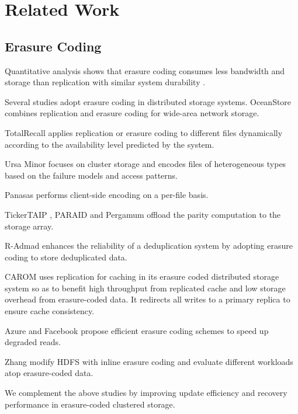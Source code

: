 \chapter{Related Work}
\label{chap:relatedwork}

\section{Erasure Coding}

Quantitative analysis shows that erasure coding consumes less bandwidth and
storage than replication with similar system durability
\cite{weatherspoon02,rodrigues05}.  

Several studies adopt erasure coding in
distributed storage systems.  OceanStore \cite{kubiatowicz00,rhea03} combines
replication and erasure coding for wide-area network storage.  

TotalRecall
\cite{bhagwan04} applies replication or erasure coding to different files
dynamically according to the availability level predicted by the system.  

Ursa Minor \cite{abd05} focuses on cluster storage and encodes files of
heterogeneous types based on the failure models and access patterns.  

Panasas \cite{welch08} performs client-side encoding on a per-file basis. 

TickerTAIP \cite{cao94}, PARAID \cite{weddle07} and Pergamum \cite{storer08}
offload the parity computation to the storage array.

R-Admad \cite{liu09} enhances the reliability of a deduplication
system by adopting erasure coding to store deduplicated data.  

CAROM \cite{ma13} uses replication for caching in its erasure coded distributed
storage system so as to benefit high throughput from replicated cache and low
storage overhead from erasure-coded data. It redirects all writes to a primary
replica to ensure cache consistency. 

Azure \cite{huang12} and Facebook \cite{sathiamoorthy13} propose efficient
erasure coding schemes to speed up degraded reads. 

Zhang \etal \cite{zhang10} modify HDFS with inline erasure coding and
evaluate different workloads atop erasure-coded data.

We complement the above studies by improving update efficiency and recovery
performance in erasure-coded clustered storage. 

